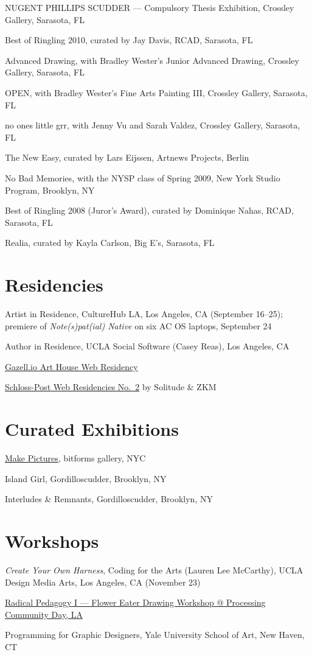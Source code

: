 \documentclass[10pt,letterpaper]{article}
\newlength{\cvyearwidth}
\newenvironment{cvlist}{%
  \begin{list}{}{%
    \setlength{\leftmargin}{\cvyearwidth}%
    \setlength{\labelwidth}{\cvyearwidth}%
    \setlength{\labelsep}{0.4em}%
    \setlength{\itemsep}{0.15em}%
    \setlength{\parsep}{0pt}%
    \setlength{\topsep}{0.2em}%
    \renewcommand{\makelabel}[1]{\color{acgray}\small ##1\hfill}%
  }%
}{\end{list}}
\newcommand{\cv}[2]{\item[#1] #2}
\begin{document}
\begin{cvlist}
  \cv{2011}{NUGENT \textperiodcentered{} PHILLIPS \textperiodcentered{} SCUDDER --- Compulsory Thesis Exhibition, Crossley Gallery, Sarasota, FL}
  \cv{2010}{Best of Ringling 2010, curated by Jay Davis, RCAD, Sarasota, FL}
  \cv{2009}{Advanced Drawing, with Bradley Wester's Junior Advanced Drawing, Crossley Gallery, Sarasota, FL}
  \cv{2009}{OPEN, with Bradley Wester's Fine Arts Painting III, Crossley Gallery, Sarasota, FL}
  \cv{2009}{no ones little grr, with Jenny Vu and Sarah Valdez, Crossley Gallery, Sarasota, FL}
  \cv{2009}{The New Easy, curated by Lars Eijssen, Artnews Projects, Berlin}
  \cv{2009}{No Bad Memories, with the NYSP class of Spring 2009, New York Studio Program, Brooklyn, NY}
  \cv{2008}{Best of Ringling 2008 (Juror's Award), curated by Dominique Nahas, RCAD, Sarasota, FL}
  \cv{2008}{Realia, curated by Kayla Carlson, Big E's, Sarasota, FL}
\end{cvlist}

\section*{Residencies}
\begin{cvlist}
  \cv{2026}{Artist in Residence, CultureHub LA, Los Angeles, CA (September 16--25); premiere of \emph{Note(s)pat(ial) Native} on six AC OS laptops, September 24}
  \cv{2026}{Author in Residence, UCLA Social Software (Casey Reas), Los Angeles, CA}
  \cv{2018}{\href{http://gazell.io/author/jeffreyas}{Gazell.io Art House Web Residency}}
  \cv{2017}{\href{https://tenminutepainting.com}{Schloss-Post Web Residencies No.~2} by Solitude \& ZKM}
\end{cvlist}

\section*{Curated Exhibitions}
\begin{cvlist}
  \cv{2018}{\href{http://www.bitforms.com/exhibitions/exhibition-history/make-pictures/make-pictures-2018}{Make Pictures}, bitforms gallery, NYC}
  \cv{2014}{Island Girl, Gordilloscudder, Brooklyn, NY}
  \cv{2013}{Interludes \& Remnants, Gordilloscudder, Brooklyn, NY}
\end{cvlist}

\section*{Workshops}
\begin{cvlist}
  \cv{2026}{\emph{Create Your Own Harness}, Coding for the Arts (Lauren Lee McCarthy), UCLA Design Media Arts, Los Angeles, CA (November 23)}
  \cv{2019}{\href{https://day.processing.org/pcd-la-tracks.html}{Radical Pedagogy I --- Flower Eater Drawing Workshop @ Processing Community Day, LA}}
  \cv{2017}{Programming for Graphic Designers, Yale University School of Art, New Haven, CT}
\end{cvlist}
\end{document}
